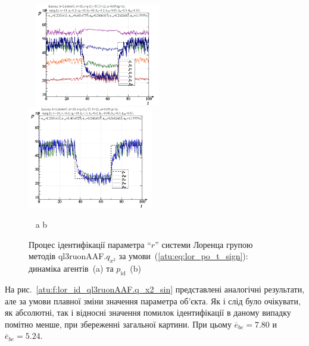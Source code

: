 \begin{figure}[ht!]
  \begin{center}
    ~ \hfill
    \includegraphics[width=0.49\textwidth]{p/cha/lor/ql3ruonAAF/lor_ql3ruonAAF_qy2-p_t_pi_sign.png}
    \hfill
    \includegraphics[width=0.49\textwidth]{p/cha/lor/ql3ruonAAF/lor_ql3ruonAAF_qy2-p_t_pz_sign.png}
    \hfill ~
  \end{center}
  \vspace{-1.0ex}
  \begin{center}
    ~ \hfill a \hfill\hfill b \hfill ~
  \end{center}
  \vspace{-1.5ex}
  \caption{Процес ідентифікації параметра ``$r$'' системи Лоренца групою методів ql3ruonAAF.$q_{x^2} $ за умови~(\ref{atu:eq:lor_po_t_sign}): динаміка агентів~(a) та $p_\mathrm{id}$~(b)}
\label{atu:f:lor_id_ql3ruonAAF.q_x2_sign}
\end{figure}


На рис.~\ref{atu:f:lor_id_ql3ruonAAF.q_x2_sin} представлені аналогічні результати,
але за умови плавної зміни значення параметра об'єкта. Як і слід
було очікувати, як абсолютні, так і відносні значення помилок
ідентифікації в даному випадку помітно менше, при збереженні
загальної картини. При цьому
$\overline{e}_{bc}=7.80$
и
$\overline{e}_{be}=5.24$.


